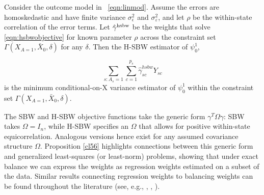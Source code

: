 \begin{proposition}\label{cl4}
    Consider the outcome model in ~\eqref{eqn:linmod}. Assume the errors are homoskedastic and have finite variance $\sigma^2_{\epsilon}$ and $\sigma^2_{\varepsilon}$, and let $\rho$ be the within-state correlation of the error terms. Let $\hat{\gamma}^{\textup{hsbw}}$ be the weights that solve \eqref{eqn:hsbwobjective} for known parameter $\rho$ across the constraint set $\Gamma(X_{A=1}, \bar{X}_0, \delta)$ for any $\delta$. Then the H-SBW estimator of $\psi_0^1$,

    \[\sum_{s: A_s = 1}\sum_{c=1}^{p_s}\hat{\gamma}_{sc}^{hsbw}Y_{sc}\] 
    is the minimum conditional-on-X variance estimator of $\psi_0^1$ within the constraint set $\Gamma(X_{A=1}, \bar{X}_0, \delta)$.
\end{proposition}

The SBW and H-SBW objective functions take the generic form $\gamma^T\Omega\gamma$: SBW takes $\Omega = I_n$, while H-SBW specifies an $\Omega$ that allows for positive within-state equicorrelation. Analogous versions hence exist for any assumed covariance structure $\Omega$. Proposition \ref{cl56} highlights connections between this generic form and generalized least-squares (or least-norm) problems, showing that under exact balance we can express the weights as regression weights estimated on a subset of the data. Similar results connecting regression weights to balancing weights can be found throughout the literature (see, e.g., \cite{kline2011oaxaca}, \cite{ben2021augmented}, \cite{chattopadhyay2021implied}).

